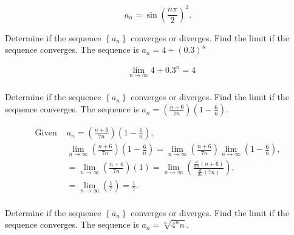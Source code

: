 \documentclass{article}
\begin{document}
            \[a_n = \sin\left( \frac{n\pi}{2} \right)^2.\]

            Determine if the sequence $\left\{ a_n \right\}$ converges or diverges. Find the limit if the sequence converges. The sequence is $a_n = 4 + (0.3)^n$\\

            \ans 

            \begin{align*}
                &\lim_{n\rightarrow \infty} 4 + 0.3^n = 4\\
            \end{align*}

            Determine if the sequence $\left\{ a_n \right\}$ converges or diverges. Find the limit if the sequence converges. The sequence is $a_n = \left( \frac{n+6}{7n} \right)\left( 1 - \frac{6}{n} \right)$.\\

            \ans 

            \begin{align*}
                \text{Given }&a_n = \left( \frac{n+6}{7n} \right)\left( 1 - \frac{6}{n} \right),\\
                &\lim_{n \rightarrow \infty} \left( \frac{n+6}{7n} \right)\left( 1 - \frac{6}{n} \right) = \lim_{n \rightarrow \infty}\left( \frac{n+6}{7n} \right)\lim_{n \rightarrow \infty} \left( 1- \frac{6}{n} \right),\\
                &= \lim_{n\rightarrow\infty}\left( \frac{n+6}{7n} \right)(1) = \lim_{n\rightarrow\infty}\left( \frac{\frac{d}{dn}(n+6)}{\frac{d}{dn}(7n)} \right),\\
                &= \lim_{n\rightarrow\infty} \left( \frac{1}{7} \right) = \frac{1}{7}.\\
            \end{align*}

            Determine if the sequence $\left\{ a_n \right\}$ converges or diverges. Find the limit if the sequence converges. The sequence is $a_n = \sqrt[n]{4^n n}$.\\

            \ans 
\end{document}
